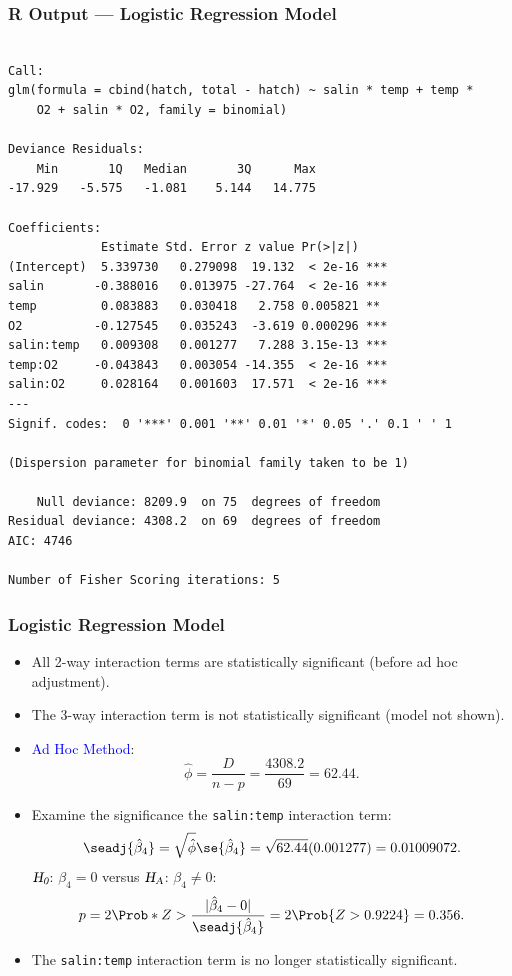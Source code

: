 \documentclass[oneside]{book}\usepackage[]{graphicx}\usepackage[svgnames]{xcolor}
\makeatletter
\newenvironment{kframe}{%
 \def\at@end@of@kframe{}%
 \ifinner\ifhmode%
  \def\at@end@of@kframe{\end{minipage}}%
  \begin{minipage}{\columnwidth}%
 \fi\fi%
 \def\FrameCommand##1{\hskip\@totalleftmargin \hskip-\fboxsep
 \colorbox{shadecolor}{##1}\hskip-\fboxsep
     \hskip-\linewidth \hskip-\@totalleftmargin \hskip\columnwidth}%
 \MakeFramed {\advance\hsize-\width
   \@totalleftmargin\z@ \linewidth\hsize
   \@setminipage}}%
 {\par\unskip\endMakeFramed%
 \at@end@of@kframe}
\newenvironment{knitrout}{}{} %
\newcommand{\HN}{\textsl{H}_{\textsl{0}}}%
\newcommand{\HA}{\textsl{H}_{\textsl{A}}}%
\DeclarePairedDelimiter\abs{\lvert}{\rvert}
\makeatother
\begin{document}
\subsubsection*{R Output --- Logistic Regression Model}
\begin{knitrout}
\color{fgcolor}\begin{kframe}
\begin{verbatim}

Call:
glm(formula = cbind(hatch, total - hatch) ~ salin * temp + temp * 
    O2 + salin * O2, family = binomial)

Deviance Residuals: 
    Min       1Q   Median       3Q      Max  
-17.929   -5.575   -1.081    5.144   14.775  

Coefficients:
             Estimate Std. Error z value Pr(>|z|)    
(Intercept)  5.339730   0.279098  19.132  < 2e-16 ***
salin       -0.388016   0.013975 -27.764  < 2e-16 ***
temp         0.083883   0.030418   2.758 0.005821 ** 
O2          -0.127545   0.035243  -3.619 0.000296 ***
salin:temp   0.009308   0.001277   7.288 3.15e-13 ***
temp:O2     -0.043843   0.003054 -14.355  < 2e-16 ***
salin:O2     0.028164   0.001603  17.571  < 2e-16 ***
---
Signif. codes:  0 '***' 0.001 '**' 0.01 '*' 0.05 '.' 0.1 ' ' 1

(Dispersion parameter for binomial family taken to be 1)

    Null deviance: 8209.9  on 75  degrees of freedom
Residual deviance: 4308.2  on 69  degrees of freedom
AIC: 4746

Number of Fisher Scoring iterations: 5
\end{verbatim}
\end{kframe}
\end{knitrout}
\subsubsection*{Logistic Regression Model}
\begin{itemize}
    \item All 2-way interaction terms are statistically significant (before ad hoc adjustment).
    \item The 3-way interaction term is not statistically significant (model not shown).
    \item \textcolor{Blue}{Ad Hoc Method}:
          \[ \hat{\phi}=\frac{D}{n-p}=\frac{4308.2}{69}=62.44. \]
    \item Examine the significance the \texttt{salin:temp} interaction term:
          \[ \seadj{\hat{\beta}_4}=\sqrt{\hat{\phi}}\se{\hat{\beta}_4}=\sqrt{62.44}(0.001277)=0.01009072. \]
          $ \HN $: $ \beta_4=0 $ versus $ \HA $: $ \beta_4\ne 0 $:
          \[ p=2\Prob*{Z>\frac{\abs{\hat{\beta}_4-0}}{\seadj{\hat{\beta}_4}}}=2\Prob{Z>0.9224}=0.356. \]
    \item The \texttt{salin:temp} interaction term is no longer statistically significant.
\end{itemize}
\end{document}
